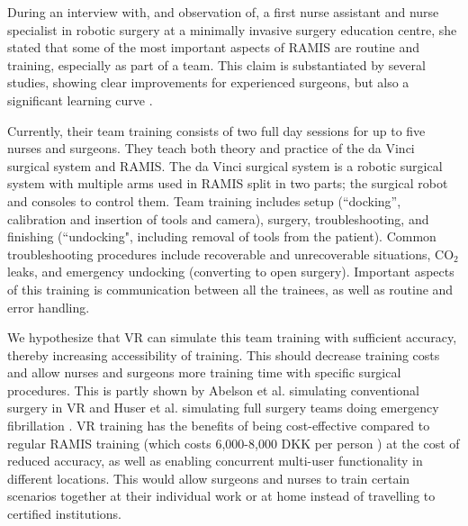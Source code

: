 \documentclass[conference]{IEEEtran}
\begin{document}
During an interview with, and observation of, a first nurse assistant and nurse specialist in robotic surgery at a minimally invasive surgery education centre, she stated that some of the most important aspects of RAMIS are routine and training, especially as part of a team. This claim is substantiated by several studies, showing clear improvements for experienced surgeons, but also a significant learning curve \citep{moorthy_human_2005,chandra_comparison_2010}.

Currently, their team training consists of two full day sessions for up to five nurses and surgeons. They teach both theory and practice of the da Vinci surgical system and RAMIS. The da Vinci surgical system is a robotic surgical system with multiple arms used in RAMIS split in two parts; the surgical robot and consoles to control them. Team training includes setup (``docking'', calibration and insertion of tools and camera), surgery, troubleshooting, and finishing (``undocking", including removal of tools from the patient). Common troubleshooting procedures include recoverable and unrecoverable situations, CO$_2$ leaks, and emergency undocking (converting to open surgery). Important aspects of this training is communication between all the trainees, as well as routine and error handling.

We hypothesize that VR can simulate this team training with sufficient accuracy, thereby increasing accessibility of training. This should decrease training costs and allow nurses and surgeons more training time with specific surgical procedures. This is partly shown by Abelson et al. simulating conventional surgery in VR and Huser et al. simulating full surgery teams doing emergency fibrillation \citep{abelson_virtual_2015,huser_simulated_2014}. VR training has the benefits of being cost-effective compared to regular RAMIS training (which costs 6,000-8,000 DKK per person \citep{miuc_miuc_nodate}) at the cost of reduced accuracy, as well as enabling concurrent multi-user functionality in different locations. This would allow surgeons and nurses to train certain scenarios together at their individual work or at home instead of travelling to certified institutions. 
\end{document}
